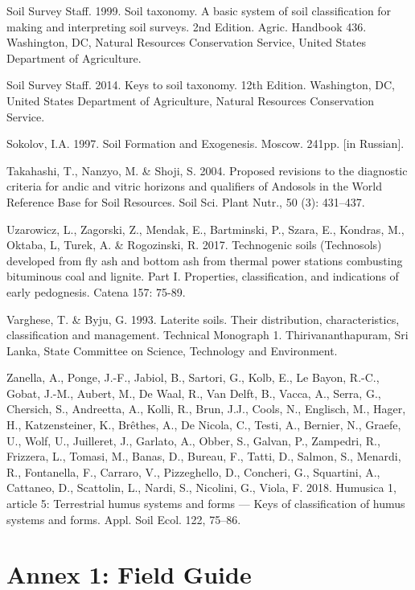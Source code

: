 \documentclass[
  letterpaper,
  DIV=11,
  numbers=noendperiod]{scrreprt}
\begin{document}
Soil Survey Staff. 1999. Soil taxonomy. A basic system of soil
classification for making and interpreting soil surveys. 2nd Edition.
Agric. Handbook 436. Washington, DC, Natural Resources Conservation
Service, United States Department of Agriculture.

Soil Survey Staff. 2014. Keys to soil taxonomy. 12th Edition.
Washington, DC, United States Department of Agriculture, Natural
Resources Conservation Service.

Sokolov, I.A. 1997. Soil Formation and Exogenesis. Moscow. 241pp. {[}in
Russian{]}.

Takahashi, T., Nanzyo, M. \& Shoji, S. 2004. Proposed revisions to the
diagnostic criteria for andic and vitric horizons and qualifiers of
Andosols in the World Reference Base for Soil Resources. Soil Sci. Plant
Nutr., 50 (3): 431--437.

Uzarowicz, L., Zagorski, Z., Mendak, E., Bartminski, P., Szara, E.,
Kondras, M., Oktaba, L, Turek, A. \& Rogozinski, R. 2017. Technogenic
soils (Technosols) developed from fly ash and bottom ash from thermal
power stations combusting bituminous coal and lignite. Part I.
Properties, classification, and indications of early pedognesis. Catena
157: 75-89.

Varghese, T. \& Byju, G. 1993. Laterite soils. Their distribution,
characteristics, classification and management. Technical Monograph 1.
Thirivananthapuram, Sri Lanka, State Committee on Science, Technology
and Environment.

Zanella, A., Ponge, J.-F., Jabiol, B., Sartori, G., Kolb, E., Le Bayon,
R.-C., Gobat, J.-M., Aubert, M., De Waal, R., Van Delft, B., Vacca, A.,
Serra, G., Chersich, S., Andreetta, A., Kolli, R., Brun, J.J., Cools,
N., Englisch, M., Hager, H., Katzensteiner, K., Brêthes, A., De Nicola,
C., Testi, A., Bernier, N., Graefe, U., Wolf, U., Juilleret, J.,
Garlato, A., Obber, S., Galvan, P., Zampedri, R., Frizzera, L., Tomasi,
M., Banas, D., Bureau, F., Tatti, D., Salmon, S., Menardi, R.,
Fontanella, F., Carraro, V., Pizzeghello, D., Concheri, G., Squartini,
A., Cattaneo, D., Scattolin, L., Nardi, S., Nicolini, G., Viola, F.
2018. Humusica 1, article 5: Terrestrial humus systems and forms ---
Keys of classification of humus systems and forms. Appl. Soil Ecol. 122,
75--86.


\hypertarget{annex-1-field-guide}{%
\chapter{Annex 1: Field Guide}\label{annex-1-field-guide}}
\end{document}

